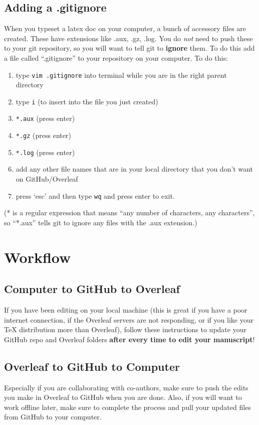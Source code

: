 \documentclass[10pt]{article}
\begin{document}
\subsection{Adding a .gitignore}
When you typeset a latex doc on your computer, a bunch of accessory files are created. These have extensions like .aux, .gz, .log. You do \emph{not} need to push these to your git repository, so you will want to tell git to \textbf{ignore} them. To do this add a file called ``.gitignore'' to your repository on your computer. To do this: 
\begin{enumerate}
\item type \texttt{vim .gitignore} into terminal while you are in the right parent directory
\item type \texttt{i} (to insert into the file you just created)
\item \texttt{*.aux} (press enter)
\item \texttt{*.gz} (press enter)
\item \texttt{*.log} (press enter)
\item add any other file names that are in your local directory that you don't want on GitHub/Overleaf
\item press `esc' and then type \texttt{wq} and press enter to exit.
\end{enumerate}
(* is a regular expression that means ``any number of characters, any characters'', so ``*.aux'' tells git to ignore any files with the .aux extension.)

\section{Workflow}
\subsection{Computer to GitHub to Overleaf}
If you have been editing on your local machine (this is great if you have a poor internet connection, if the Overleaf servers are not responding, or if you like your TeX distribution more than Overleaf), follow these instructions to update your GitHub repo and Overleaf folders \textbf{after every time to edit your manuscript}!

\subsection{Overleaf to GitHub to Computer}
Especially if you are collaborating with co-authors, make sure to push the edits you make in Overleaf to GitHub when you are done. Also, if you will want to work offline later, make sure to complete the process and pull your updated files from GitHub to your computer.
\end{document}
